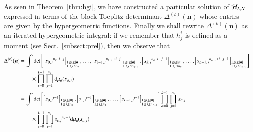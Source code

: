 \documentclass[12pt]{article}
\numberwithin{equation}{section}
\begin{document}
As seen in Theorem~\ref{thm:hgi},
we have constructed a particular solution of ${\cal H}_{L,N}$
expressed in terms of the block-Toeplitz determinant 
$\Delta^{(k)}({\boldsymbol n})$
whose entries are given by the hypergeometric functions.
Finally we shall rewrite $\Delta^{(k)}({\boldsymbol n})$
as an iterated hypergeometric integral:
if we remember that $h^i_j$ is defined as a moment
(see Sect.~\ref{subsect:prel}), 
then we observe that
\begin{align}
\nonumber
\Delta^{(k)}({\boldsymbol n})
&=
\int
\det \left[
\left[ {s_{0,j}}^{n_0+i-j} \right]_{
\begin{subarray}{l}
1 \leq i \leq |{\boldsymbol n}|\\
1 \leq j \leq n_0 
\end{subarray}},
\ldots,
\left[ {s_{k-1,j}}^{n_{k-1}+i-j} \right]_{
\begin{subarray}{l}
1 \leq i \leq |{\boldsymbol n}|\\
1 \leq j \leq n_{k-1} 
\end{subarray}},
\left[ {s_{k,j}}^{n_{k}+i-j-1} \right]_{
\begin{subarray}{l}
1 \leq i \leq |{\boldsymbol n}|\\
1 \leq j \leq n_{k} 
\end{subarray}},
\ldots,
\left[ {s_{L-1,j}}^{n_{L-1}+i-j-1} \right]_{
\begin{subarray}{l}
1 \leq i \leq |{\boldsymbol n}|\\
1 \leq j \leq n_{L-1} 
\end{subarray}}
\right]
\\
&
\nonumber
 \qquad
\times
\prod_{a=0}^{L-1}
\prod_{j=1}^{n_a} {\rm d}\mu_a(s_{a,j})
\\
\nonumber
&=
\int
\det \left[
\left[ {s_{0,j}}^{i-1} \right]_{
\begin{subarray}{l}
1 \leq i \leq |{\boldsymbol n}|\\
1 \leq j \leq n_0 
\end{subarray}},
\left[ {s_{1,j}}^{i-1} \right]_{
\begin{subarray}{l}
1 \leq i \leq |{\boldsymbol n}|\\
1 \leq j \leq n_1 
\end{subarray}},
\ldots,
\left[ {s_{L-1,j}}^{i-1}  \right]_{
\begin{subarray}{l}
1 \leq i \leq |{\boldsymbol n}|\\
1 \leq j \leq n_{L-1} 
\end{subarray}}
\right]
\prod_{a=0}^{k-1}
\prod_{j=1}^{n_a} 
{s_{a,j}}
\\
& 
\qquad 
\times
\prod_{a=0}^{L-1}
\prod_{j=1}^{n_a} 
{s_{a,j}}^{n_a-j}
{\rm d}\mu_a(s_{a,j})
\label{eq:intdelta}
\end{align}
\end{document}
